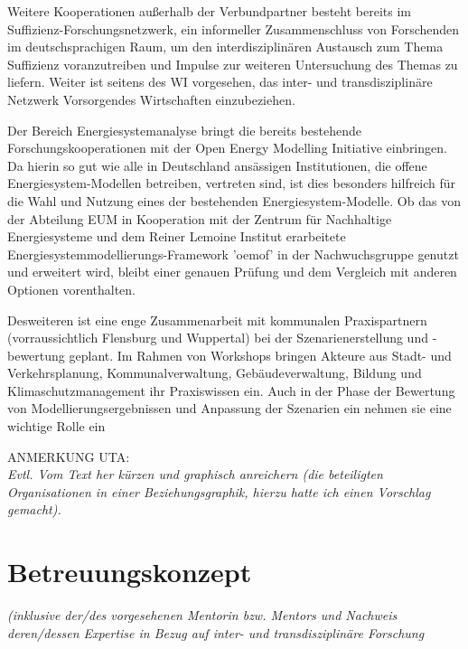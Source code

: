 \documentclass[a4paper,11pt,twoside]{scrartcl}
\begin{document}
Weitere Kooperationen außerhalb der Verbundpartner besteht bereits im Suffizienz-Forschungsnetzwerk, ein informeller Zusammenschluss von Forschenden im deutschsprachigen Raum, um den interdisziplinären Austausch zum Thema Suffizienz voranzutreiben und Impulse zur weiteren Untersuchung des Themas zu liefern. Weiter ist seitens des WI vorgesehen, das inter- und transdisziplinäre Netzwerk Vorsorgendes Wirtschaften einzubeziehen.

Der Bereich Energiesystemanalyse bringt die bereits bestehende Forschungskooperationen mit der Open Energy Modelling Initiative \cite{openmod} einbringen. Da hierin so gut wie alle in Deutschland ansässigen Institutionen, die offene Energiesystem-Modellen betreiben, vertreten sind, ist dies besonders hilfreich für die Wahl und Nutzung eines der bestehenden Energiesystem-Modelle. Ob das von der Abteilung EUM in Kooperation mit der Zentrum für Nachhaltige Energiesysteme und dem Reiner Lemoine Institut erarbeitete Energiesystemmodellierungs-Framework 'oemof' in der Nachwuchsgruppe genutzt und erweitert wird, bleibt einer genauen Prüfung und dem Vergleich mit anderen Optionen vorenthalten. 

Desweiteren ist eine enge Zusammenarbeit mit kommunalen Praxispartnern (vorraussichtlich Flensburg und Wuppertal) bei der Szenarienerstellung und -bewertung geplant. Im Rahmen von Workshops bringen Akteure aus Stadt- und Verkehrsplanung, Kommunalverwaltung, Gebäudeverwaltung, Bildung und Klimaschutzmanagement ihr Praxiswissen ein. Auch in der Phase der Bewertung von Modellierungsergebnissen und Anpassung der Szenarien ein nehmen sie eine wichtige Rolle ein

ANMERKUNG UTA:\\
\textit{Evtl. Vom Text her kürzen und graphisch anreichern (die beteiligten Organisationen in einer Beziehungsgraphik, hierzu hatte ich einen Vorschlag gemacht).}

\section{Betreuungskonzept}
\textit{(inklusive der/des vorgesehenen Mentorin bzw. Mentors und Nachweis deren/dessen Expertise in Bezug auf inter- und transdisziplinäre Forschung}
\end{document}
